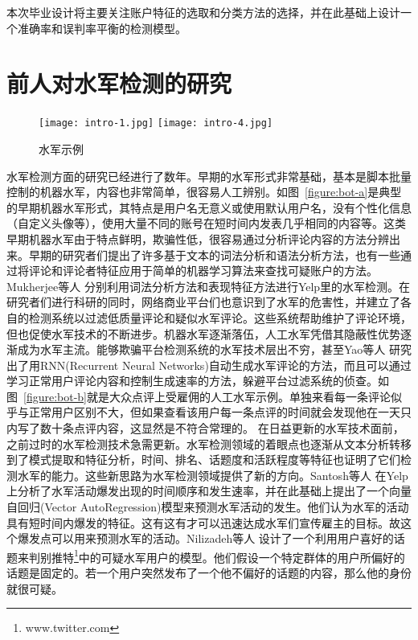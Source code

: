 本次毕业设计将主要关注账户特征的选取和分类方法的选择，并在此基础上设计一个准确率和误判率平衡的检测模型。

\section{前人对水军检测的研究}

\begin{figure}[h]
	\centering
	{\texttt{[image: intro-1.jpg]}}
	\hspace{4em}
	{\texttt{[image: intro-4.jpg]}}
	\caption[水军示例]{水军示例}
\end{figure}

水军检测方面的研究已经进行了数年\cite{Spirin:2012}。早期的水军形式非常基础，基本是脚本批量控制的机器水军，内容也非常简单，很容易人工辨别。如图~\ref{figure:bot-a}是典型的早期机器水军形式，其特点是用户名无意义或使用默认用户名，没有个性化信息（自定义头像等），使用大量不同的账号在短时间内发表几乎相同的内容等。这类早期机器水军由于特点鲜明，欺骗性低，很容易通过分析评论内容的方法分辨出来。早期的研究者们提出了许多基于文本的词法分析和语法分析方法，也有一些通过将评论和评论者特征应用于简单的机器学习算法来查找可疑账户的方法。Mukherjee等人 \parencite{Mukherjee:2013}分别利用词法分析方法和表现特征方法进行Yelp里的水军检测。在研究者们进行科研的同时，网络商业平台们也意识到了水军的危害性，并建立了各自的检测系统以过滤低质量评论和疑似水军评论。这些系统帮助维护了评论环境，但也促使水军技术的不断进步。机器水军逐渐落伍，人工水军凭借其隐蔽性优势逐渐成为水军主流。能够欺骗平台检测系统的水军技术层出不穷，甚至Yao等人 \parencite{Y.Yao:2017}研究出了用RNN(Recurrent Neural Networks)自动生成水军评论的方法，而且可以通过学习正常用户评论内容和控制生成速率的方法，躲避平台过滤系统的侦查。如图~\ref{figure:bot-b}就是大众点评上受雇佣的人工水军示例。单独来看每一条评论似乎与正常用户区别不大，但如果查看该用户每一条点评的时间就会发现他在一天只内写了数十条点评内容，这显然是不符合常理的。 在日益更新的水军技术面前，之前过时的水军检测技术急需更新。水军检测领域的着眼点也逐渐从文本分析转移到了模式提取和特征分析，时间、排名、话题度和活跃程度等特征也证明了它们检测水军的能力。这些新思路为水军检测领域提供了新的方向。Santosh等人 \parencite{Santosh:2016}在Yelp上分析了水军活动爆发出现的时间顺序和发生速率，并在此基础上提出了一个向量自回归(Vector AutoRegression)模型来预测水军活动的发生。他们认为水军的活动具有短时间内爆发的特征。这有这有才可以迅速达成水军们宣传雇主的目标。故这个爆发点可以用来预测水军的活动。Nilizadeh等人 \parencite{Nilizadeh:2017} 设计了一个利用用户喜好的话题来判别推特\footnote{www.twitter.com}中的可疑水军用户的模型。他们假设一个特定群体的用户所偏好的话题是固定的。若一个用户突然发布了一个他不偏好的话题的内容，那么他的身份就很可疑。

